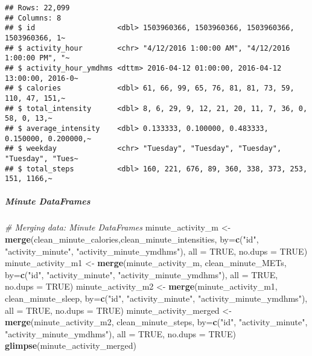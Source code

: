 \documentclass[
]{article}
\newenvironment{Shaded}{\begin{snugshade}}{\end{snugshade}}
\newcommand{\AttributeTok}[1]{\textcolor[rgb]{0.13,0.29,0.53}{#1}}
\newcommand{\CommentTok}[1]{\textcolor[rgb]{0.56,0.35,0.01}{\textit{#1}}}
\newcommand{\ConstantTok}[1]{\textcolor[rgb]{0.56,0.35,0.01}{#1}}
\newcommand{\FunctionTok}[1]{\textcolor[rgb]{0.13,0.29,0.53}{\textbf{#1}}}
\newcommand{\NormalTok}[1]{#1}
\newcommand{\OtherTok}[1]{\textcolor[rgb]{0.56,0.35,0.01}{#1}}
\newcommand{\StringTok}[1]{\textcolor[rgb]{0.31,0.60,0.02}{#1}}
\begin{document}
\begin{verbatim}
## Rows: 22,099
## Columns: 8
## $ id                   <dbl> 1503960366, 1503960366, 1503960366, 1503960366, 1~
## $ activity_hour        <chr> "4/12/2016 1:00:00 AM", "4/12/2016 1:00:00 PM", "~
## $ activity_hour_ymdhms <dttm> 2016-04-12 01:00:00, 2016-04-12 13:00:00, 2016-0~
## $ calories             <dbl> 61, 66, 99, 65, 76, 81, 81, 73, 59, 110, 47, 151,~
## $ total_intensity      <dbl> 8, 6, 29, 9, 12, 21, 20, 11, 7, 36, 0, 58, 0, 13,~
## $ average_intensity    <dbl> 0.133333, 0.100000, 0.483333, 0.150000, 0.200000,~
## $ weekday              <chr> "Tuesday", "Tuesday", "Tuesday", "Tuesday", "Tues~
## $ total_steps          <dbl> 160, 221, 676, 89, 360, 338, 373, 253, 151, 1166,~
\end{verbatim}

\hypertarget{minute-dataframes-7}{%
\subparagraph{Minute DataFrames}\label{minute-dataframes-7}}

\begin{Shaded}
\begin{Highlighting}[]
\CommentTok{\# Merging data: Minute DataFrames}
\NormalTok{minute\_activity\_m }\OtherTok{\textless{}{-}} \FunctionTok{merge}\NormalTok{(clean\_minute\_calories,clean\_minute\_intensities, }\AttributeTok{by=}\FunctionTok{c}\NormalTok{(}\StringTok{"id"}\NormalTok{, }\StringTok{"activity\_minute"}\NormalTok{, }\StringTok{"activity\_minute\_ymdhms"}\NormalTok{), }\AttributeTok{all =} \ConstantTok{TRUE}\NormalTok{, }\AttributeTok{no.dups =} \ConstantTok{TRUE}\NormalTok{)}
\NormalTok{minute\_activity\_m1 }\OtherTok{\textless{}{-}} \FunctionTok{merge}\NormalTok{(minute\_activity\_m, clean\_minute\_METs, }\AttributeTok{by=}\FunctionTok{c}\NormalTok{(}\StringTok{"id"}\NormalTok{, }\StringTok{"activity\_minute"}\NormalTok{, }\StringTok{"activity\_minute\_ymdhms"}\NormalTok{), }\AttributeTok{all =} \ConstantTok{TRUE}\NormalTok{, }\AttributeTok{no.dups =} \ConstantTok{TRUE}\NormalTok{)}
\NormalTok{minute\_activity\_m2 }\OtherTok{\textless{}{-}} \FunctionTok{merge}\NormalTok{(minute\_activity\_m1, clean\_minute\_sleep, }\AttributeTok{by=}\FunctionTok{c}\NormalTok{(}\StringTok{"id"}\NormalTok{, }\StringTok{"activity\_minute"}\NormalTok{, }\StringTok{"activity\_minute\_ymdhms"}\NormalTok{), }\AttributeTok{all =} \ConstantTok{TRUE}\NormalTok{, }\AttributeTok{no.dups =} \ConstantTok{TRUE}\NormalTok{)}
\NormalTok{minute\_activity\_merged }\OtherTok{\textless{}{-}} \FunctionTok{merge}\NormalTok{(minute\_activity\_m2, clean\_minute\_steps, }\AttributeTok{by=}\FunctionTok{c}\NormalTok{(}\StringTok{"id"}\NormalTok{, }\StringTok{"activity\_minute"}\NormalTok{, }\StringTok{"activity\_minute\_ymdhms"}\NormalTok{), }\AttributeTok{all =} \ConstantTok{TRUE}\NormalTok{, }\AttributeTok{no.dups =} \ConstantTok{TRUE}\NormalTok{)}
\FunctionTok{glimpse}\NormalTok{(minute\_activity\_merged)}
\end{Highlighting}
\end{Shaded}
\end{document}
